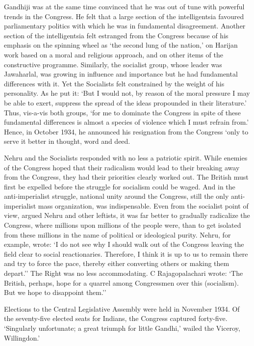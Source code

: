 Gandhiji was at the same time convinced that he was out of tune with powerful trends in the Congress. He felt that a large section of the intelligentsia favoured parliamentary politics with which he was in fundamental disagreement. Another section of the intelligentsia felt estranged from the Congress because of his emphasis on the spinning wheel as `the second lung of the nation,' on Harijan work based on a moral and religious approach, and on other items of the constructive programme. Similarly, the socialist group, whose leader was Jawaharlal, was growing in influence and importance but he had fundamental differences with it. Yet the Socialists felt constrained by the weight of his personality. As he put it: `But I would not, by reason of the moral pressure I may be able to exert, suppress the spread of the ideas propounded in their literature.' Thus, vis-a-vis both groups, `for me to dominate the Congress in spite of these fundamental differences is almost a species of violence which I must refrain from.' Hence, in October 1934, he announced his resignation from the Congress `only to serve it better in thought, word and deed. 

Nehru and the Socialists responded with no less a patriotic spirit. While enemies of the Congress hoped that their radicalism would lead to their breaking away from the Congress, they had their priorities clearly worked out. The British must first be expelled before the struggle for socialism could be waged. And in the anti-imperialist struggle, national unity around the Congress, still the only anti-imperialist mass organization, was indispensable. Even from the socialist point of view, argued Nehru and other leftists, it was far better to gradually radicalize the Congress, where millions upon millions of the people were, than to get isolated from these millions in the name of political or ideological purity. Nehru, for example, wrote: `I do not see why I should walk out of the Congress leaving the field clear to social reactionaries. Therefore, I think it is up to us to remain there and try to force the pace, thereby either converting others or making them depart.'' The Right was no less accommodating. C Rajagopalachari wrote: `The British, perhaps, hope for a quarrel among Congressmen over this (socialism). But we hope to disappoint them.'' 

Elections to the Central Legislative Assembly were held in November 1934. Of the seventy-five elected seats for Indians, the Congress captured forty-five. `Singularly unfortunate; a great triumph for little Gandhi,' wailed the Viceroy, Willingdon.'


